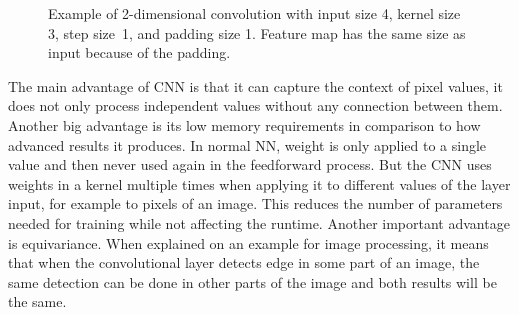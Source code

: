 \begin{figure}[!h]
    \centering
    \caption{\label{fig:2d-convolution}Example of 2-dimensional convolution with input size 4, kernel size 3, step size~1, and padding size 1. Feature map has the same size as input because of the padding.}
\end{figure}

The main advantage of CNN is that it can capture the context of pixel values, it does not only process independent values without any connection between them. Another big advantage is its low memory requirements in comparison to how advanced results it produces. In normal NN, weight is only applied to a single value and then never used again in the feedforward process. But the CNN uses weights in a kernel multiple times when applying it to different values of the layer input, for example to pixels of an image. This reduces the number of parameters needed for training while not affecting the runtime. Another important advantage is equivariance. When explained on an example for image processing, it means that when the convolutional layer detects edge in some part of an image, the same detection can be done in other parts of the image and both results will be the same.

